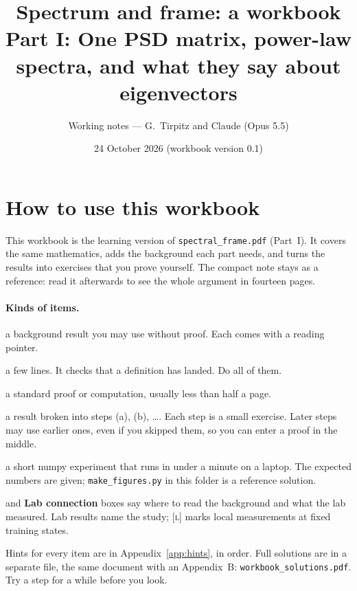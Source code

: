\documentclass[11pt,a4paper]{article}
\title{Spectrum and frame: a workbook\\[0.3em]
\large Part I: One PSD matrix, power-law spectra, and what they say about eigenvectors}
\author{Working notes --- G.~Tirpitz and Claude (Opus 5.5)}
\date{24 October 2026 (workbook version 0.1)\\[0.2em]\small\versionline}
\newcommand{\evL}{\textsc{[l]}}
\theoremstyle{plain}
\theoremstyle{definition}
\theoremstyle{remark}
\begin{document}
\maketitle
\tableofcontents

\section*{How to use this workbook}

This workbook is the learning version of \texttt{spectral\_frame.pdf} (Part~I). It covers the same mathematics, adds
the background each part needs, and turns the results into exercises that you prove yourself. The compact note stays
as a reference: read it afterwards to see the whole argument in fourteen pages.

\paragraph{Kinds of items.}
\begin{description}[leftmargin=1.2em,itemsep=1pt]
\item[Fact:] a background result you may use without proof. Each comes with a reading pointer.
\item[Warm-up:] a few lines. It checks that a definition has landed. Do all of them.
\item[Exercise:] a standard proof or computation, usually less than half a page.
\item[Guided proof:] a result broken into steps (a), (b), \ldots. Each step is a small exercise. Later steps may use
  earlier ones, even if you skipped them, so you can enter a proof in the middle.
\item[Compute:] a short numpy experiment that runs in under a minute on a laptop. The expected numbers are given;
  \texttt{make\_figures.py} in this folder is a reference solution.
\item[Reading] and \textbf{Lab connection} boxes say where to read the background and what the lab measured. Lab
  results name the study; \evL{} marks local measurements at fixed training states.
\end{description}
Hints for every item are in Appendix~\ref{app:hints}, in order. Full solutions are in a separate file, the same
document with an Appendix~B: \texttt{workbook\_solutions.pdf}. Try a step for a while before you look.
\end{document}
